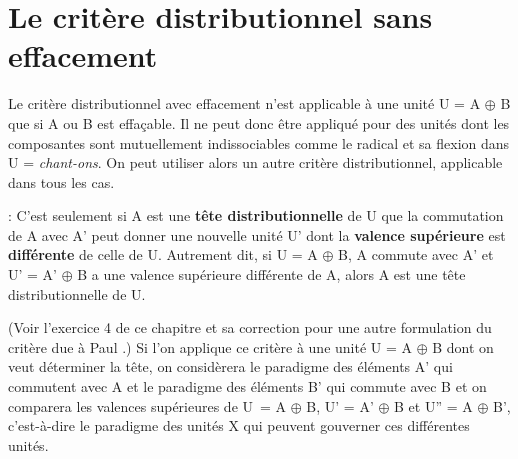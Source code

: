 \section{Le critère distributionnel sans effacement}\label{sec:3.3.13}

Le critère distributionnel avec effacement n’est applicable à une unité U = A ${\oplus}$ B que si A ou B est effaçable. Il ne peut donc être appliqué pour des unités dont les composantes sont mutuellement indissociables comme le radical et sa flexion dans U = \textit{chant-ons}. On peut utiliser alors un autre critère distributionnel, applicable dans tous les cas.

{ : C’est seulement si A est une \textbf{tête distributionnelle} de U que la commutation de A avec A’ peut donner une nouvelle unité U’ dont la \textbf{valence supérieure} est \textbf{différente} de celle de U. Autrement dit, si U = A ${\oplus}$ B, A commute avec A’ et U’ = A’ ${\oplus}$ B a une valence supérieure différente de A, alors A est une tête distributionnelle de U.}

(Voir l’exercice 4 de ce chapitre et sa correction pour une autre formulation du critère due à Paul \citealt[8]{garde1977ordre}.) Si l’on applique ce critère à une unité U = A ${\oplus}$ B dont on veut déterminer la tête, on considèrera le paradigme des éléments A’ qui commutent avec A et le paradigme des éléments B’ qui commute avec B et on comparera les valences supérieures de U~= A ${\oplus}$ B, U’ = A’ ${\oplus}$ B et U” = A ${\oplus}$ B’, c’est-à-dire le paradigme des unités X qui peuvent gouverner ces différentes unités.

